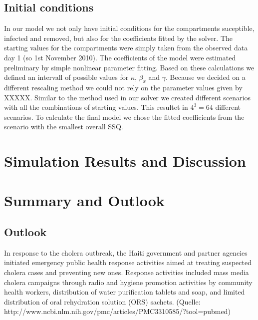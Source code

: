 \documentclass[11pt]{article}
\begin{document}
\subsection{Initial conditions}
\label{sec:initial conditions}
In our model we not only have initial conditions for the compartments suceptible, infected and removed, but also for the coefficients fitted by the solver. The starting values for the compartments were simply taken from the observed data day 1 (so 1st November 2010). The coefficients of the model were estimated preliminary by simple nonlinear parameter fitting. Based on these calculations we defined an intervall of possible values for $\kappa$, $\beta_{x}$ and $\gamma$. Because we decided on a different rescaling method we could not rely on the parameter values given by XXXXX. Similar to the method used in our solver we created different scenarios with all the combinations of starting values. This resultet in $4^{3}=64$ different scenarios. To calculate the final model we chose the fitted coefficients from the scenario with the smallest overall SSQ.










\section{Simulation Results and Discussion}



























\section{Summary and Outlook}

\subsection{Outlook}
In response to the cholera outbreak, the Haiti government and partner agencies initiated emergency public health response activities aimed at treating suspected cholera cases and preventing new ones. Response activities included mass media cholera campaigns through radio and hygiene promotion activities by community health workers, distribution of water purification tablets and soap, and limited distribution of oral rehydration solution (ORS) sachets. (Quelle: http://www.ncbi.nlm.nih.gov/pmc/articles/PMC3310585/?tool=pubmed)
\end{document}
